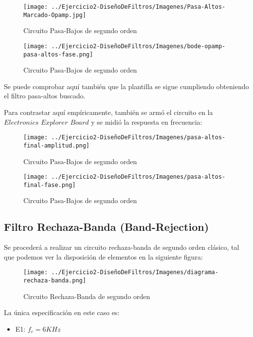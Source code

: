 \begin{figure}[H]
    \centering
    \texttt{[image: ../Ejercicio2-DiseñoDeFiltros/Imagenes/Pasa-Altos-Marcado-Opamp.jpg]}
    \caption{Circuito Pasa-Bajos de segundo orden}
\end{figure}

\begin{figure}[H]
    \centering
    \texttt{[image: ../Ejercicio2-DiseñoDeFiltros/Imagenes/bode-opamp-pasa-altos-fase.png]}
    \caption{Circuito Pasa-Bajos de segundo orden}
\end{figure}

Se puede comprobar aquí también que la plantilla se sigue cumpliendo obteniendo el filtro pasa-altos buscado.

Para contrastar aquí empíricamente, también se armó el circuito en la $Electronics$ $Explorer$ $Board$ y se midió la respuesta
en frecuencia:

\begin{figure}[H]
    \centering
    \texttt{[image: ../Ejercicio2-DiseñoDeFiltros/Imagenes/pasa-altos-final-amplitud.png]}
    \caption{Circuito Pasa-Bajos de segundo orden}
\end{figure}

\begin{figure}[H]
    \centering
    \texttt{[image: ../Ejercicio2-DiseñoDeFiltros/Imagenes/pasa-altos-final-fase.png]}
    \caption{Circuito Pasa-Bajos de segundo orden}
\end{figure}



\subsection{Filtro Rechaza-Banda (Band-Rejection)}

Se procederá a realizar un circuito rechaza-banda de segundo orden clásico, tal que podemos
ver la disposición de elementos en la siguiente figura:

\begin{figure}[H]
    \centering
    \texttt{[image: ../Ejercicio2-DiseñoDeFiltros/Imagenes/diagrama-rechaza-banda.png]}
    \caption{Circuito Rechaza-Banda de segundo orden}
\end{figure}

La única especificación en este caso es:

\begin{itemize}
	\item E1: $f_c=6 KHz$
\end{itemize}

